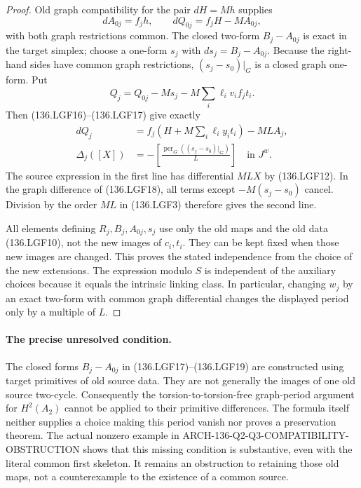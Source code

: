 \begin{proof}
Old graph compatibility for the pair \(dH=Mh\) supplies
\[
 dA_{0j}=f_jh,\qquad dQ_{0j}=f_jH-MA_{0j},               \tag{136.LGF17}
\]
with both graph restrictions common. The closed two-form
\(B_j-A_{0j}\) is exact in the target simplex; choose a
one-form \(s_j\) with \(ds_j=B_j-A_{0j}\). Because the
right-hand sides have common graph restrictions,
\((s_j-s_0)|_G\) is a closed graph one-form. Put
\[
 Q_j=Q_{0j}-M s_j-M\sum_i\ell_i v_i f_jt_i.
                                                        \tag{136.LGF18}
\]
Then (136.LGF16)--(136.LGF17) give exactly
\[
\begin{aligned}
 dQ_j&=f_j\left(H+M\sum_i\ell_i y_i t_i\right)-ML A_j,\\
 \Delta_j([X])
   &=-\left[\frac{\operatorname{per}_G((s_j-s_0)|_G)}{L}\right]
          \quad\text{in }J^w .
\end{aligned}                                         \tag{136.LGF19}
\]
The source expression in the first line has differential \(MLX\)
by (136.LGF12). In the graph difference of (136.LGF18), all terms
except \(-M(s_j-s_0)\) cancel. Division by the order \(ML\)
in (136.LGF3) therefore gives the second line.

All elements defining \(R_j,B_j,A_{0j},s_j\) use only the
old maps and the old data (136.LGF10), not the new images of
\(c_i,t_i\). They can be kept fixed when those new images
are changed. This proves the stated independence from the
choice of the new extensions. The expression modulo \(S\)
is independent of the auxiliary choices because it equals the
intrinsic linking class. In particular, changing \(w_j\) by
an exact two-form with common graph differential changes the
displayed period only by a multiple of \(L\).
\end{proof}

\paragraph{The precise unresolved condition.}
The closed forms \(B_j-A_{0j}\) in (136.LGF17)--(136.LGF19)
are constructed using target primitives of old source data.
They are not generally the images of one old source two-cycle.
Consequently the torsion-to-torsion-free graph-period argument
for \(H^2(A_2)\) cannot be applied to their primitive differences.
The formula itself neither supplies a choice making this period
vanish nor proves a preservation theorem. The actual nonzero
example in ARCH-136-Q2-Q3-COMPATIBILITY-OBSTRUCTION shows that
this missing condition is substantive, even with the literal common
first skeleton. It remains an obstruction to retaining those old
maps, not a counterexample to the existence of a common source.

